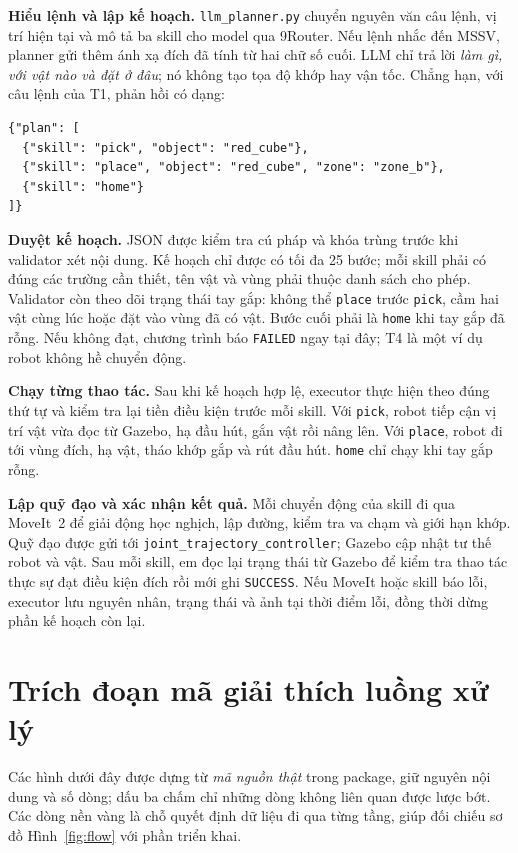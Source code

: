 \documentclass[11pt,a4paper]{article}
\begin{document}
\textbf{Hiểu lệnh và lập kế hoạch.} \texttt{llm\_planner.py} chuyển nguyên văn
câu lệnh, vị trí hiện tại và mô tả ba skill cho model qua 9Router. Nếu lệnh
nhắc đến MSSV, planner gửi thêm ánh xạ đích đã tính từ hai chữ số cuối. LLM
chỉ trả lời \emph{làm gì, với vật nào và đặt ở đâu}; nó không tạo tọa độ khớp
hay vận tốc. Chẳng hạn, với câu lệnh của T1, phản hồi có dạng:
\begin{lstlisting}
{"plan": [
  {"skill": "pick", "object": "red_cube"},
  {"skill": "place", "object": "red_cube", "zone": "zone_b"},
  {"skill": "home"}
]}
\end{lstlisting}

\textbf{Duyệt kế hoạch.} JSON được kiểm tra cú pháp và khóa trùng trước khi
validator xét nội dung. Kế hoạch chỉ được có tối đa 25 bước; mỗi skill phải
có đúng các trường cần thiết, tên vật và vùng phải thuộc danh sách cho phép.
Validator còn theo dõi trạng thái tay gắp: không thể \texttt{place} trước
\texttt{pick}, cầm hai vật cùng lúc hoặc đặt vào vùng đã có vật. Bước cuối
phải là \texttt{home} khi tay gắp đã rỗng. Nếu không đạt, chương trình báo
\texttt{FAILED} ngay tại đây; T4 là một ví dụ robot không hề chuyển động.

\textbf{Chạy từng thao tác.} Sau khi kế hoạch hợp lệ, executor thực hiện theo
đúng thứ tự và kiểm tra lại tiền điều kiện trước mỗi skill. Với
\texttt{pick}, robot tiếp cận vị trí vật vừa đọc từ Gazebo, hạ đầu hút, gắn
vật rồi nâng lên. Với \texttt{place}, robot đi tới vùng đích, hạ vật, tháo
khớp gắp và rút đầu hút. \texttt{home} chỉ chạy khi tay gắp rỗng.

\textbf{Lập quỹ đạo và xác nhận kết quả.} Mỗi chuyển động của skill đi qua
MoveIt~2 để giải động học nghịch, lập đường, kiểm tra va chạm và giới hạn
khớp. Quỹ đạo được gửi tới \texttt{joint\_trajectory\_controller}; Gazebo
cập nhật tư thế robot và vật. Sau mỗi skill, em đọc lại trạng thái từ Gazebo
để kiểm tra thao tác thực sự đạt điều kiện đích rồi mới ghi \texttt{SUCCESS}.
Nếu MoveIt hoặc skill báo lỗi, executor lưu nguyên nhân, trạng thái và ảnh
tại thời điểm lỗi, đồng thời dừng phần kế hoạch còn lại.

\newpage
\section{Trích đoạn mã giải thích luồng xử lý}
Các hình dưới đây được dựng từ \emph{mã nguồn thật} trong package, giữ nguyên
nội dung và số dòng; dấu ba chấm chỉ những dòng không liên quan được lược bớt.
Các dòng nền vàng là chỗ quyết định dữ liệu đi qua từng tầng, giúp đối chiếu
sơ đồ Hình~\ref{fig:flow} với phần triển khai.
\end{document}
